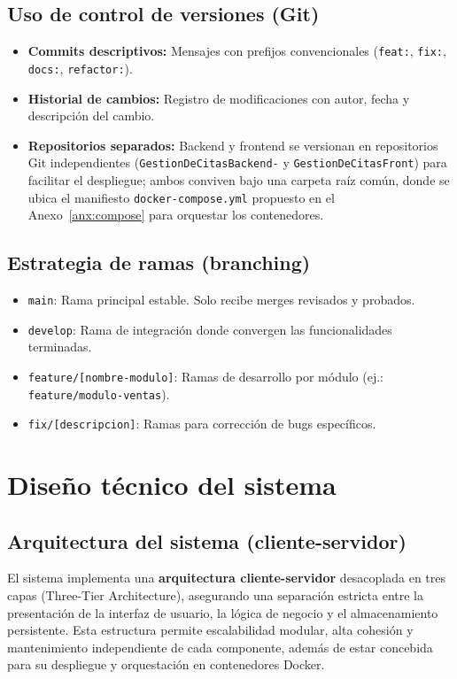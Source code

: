 \documentclass[11pt,a4paper]{report}
\begin{document}
\subsection{Uso de control de versiones (Git)}
\begin{itemize}
\item \textbf{Commits descriptivos:} Mensajes con prefijos convencionales (\texttt{feat:}, \texttt{fix:}, \texttt{docs:}, \texttt{refactor:}).
\item \textbf{Historial de cambios:} Registro de modificaciones con autor, fecha y descripción del cambio.
\item \textbf{Repositorios separados:} Backend y frontend se versionan en repositorios Git independientes (\texttt{GestionDeCitasBackend-} y \texttt{GestionDeCitasFront}) para facilitar el despliegue; ambos conviven bajo una carpeta raíz común, donde se ubica el manifiesto \texttt{docker-compose.yml} propuesto en el Anexo~\ref{anx:compose} para orquestar los contenedores.
\end{itemize}

\subsection{Estrategia de ramas (branching)}
\begin{itemize}
\item \texttt{main}: Rama principal estable. Solo recibe merges revisados y probados.
\item \texttt{develop}: Rama de integración donde convergen las funcionalidades terminadas.
\item \texttt{feature/[nombre-modulo]}: Ramas de desarrollo por módulo (ej.: \texttt{feature/modulo-ventas}).
\item \texttt{fix/[descripcion]}: Ramas para corrección de bugs específicos.
\end{itemize}

\section{Diseño técnico del sistema}
\subsection{Arquitectura del sistema (cliente-servidor)}
El sistema implementa una \textbf{arquitectura cliente-servidor} desacoplada en tres capas (Three-Tier Architecture), asegurando una separación estricta entre la presentación de la interfaz de usuario, la lógica de negocio y el almacenamiento persistente. Esta estructura permite escalabilidad modular, alta cohesión y mantenimiento independiente de cada componente, además de estar concebida para su despliegue y orquestación en contenedores Docker.
\end{document}
